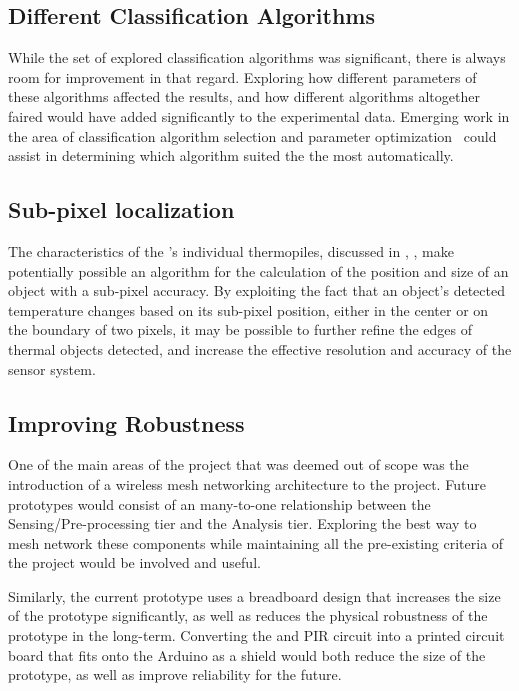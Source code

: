 \documentclass[../thesis/thesis.tex]{subfiles}
\begin{document}
\subsection{Different Classification Algorithms}
While the set of explored classification algorithms was significant, there is always room for improvement in that regard. Exploring how different parameters of these algorithms affected the results, and how different algorithms altogether faired would have added significantly to the experimental data. Emerging work in the area of classification algorithm selection and parameter optimization~\cite{thornton2013auto} could assist in determining which algorithm suited the \mlx the most automatically.

\subsection{Sub-pixel localization}
The  characteristics of the \mlx's individual thermopiles, discussed in , , make potentially possible an algorithm for the calculation of the position and size of an object with a sub-pixel accuracy. By exploiting the fact that an object's detected temperature changes based on its sub-pixel position, either in the center or on the boundary of two pixels, it may be possible to further refine the edges of thermal objects detected, and increase the effective resolution and accuracy of the sensor system.

\subsection{Improving Robustness}
One of the main areas of the project that was deemed out of scope was the introduction of a wireless mesh networking architecture to the project. Future prototypes would consist of an many-to-one relationship between the Sensing/Pre-processing tier and the Analysis tier. Exploring the best way to mesh network these components while maintaining all the pre-existing criteria of the project would be involved and useful.

Similarly, the current prototype uses a breadboard design that increases the size of the prototype significantly, as well as reduces the physical robustness of the prototype in the long-term. Converting the \mlx and PIR circuit into a printed circuit board that fits onto the Arduino as a shield would both reduce the size of the prototype, as well as improve reliability for the future.
\end{document}
